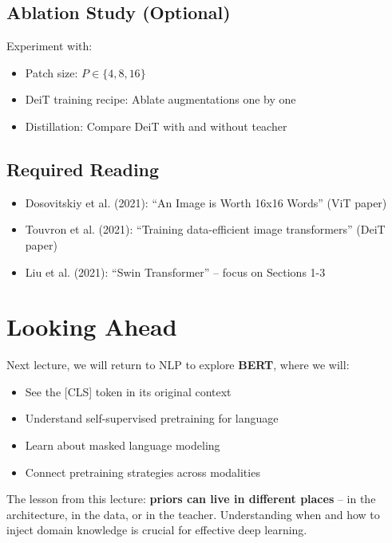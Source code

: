 \documentclass{article}
\begin{document}
\subsection{Ablation Study (Optional)}

Experiment with:
\begin{itemize}
\item Patch size: $P \in \{4, 8, 16\}$
\item DeiT training recipe: Ablate augmentations one by one
\item Distillation: Compare DeiT with and without teacher
\end{itemize}

\subsection{Required Reading}

\begin{itemize}
\item Dosovitskiy et al. (2021): ``An Image is Worth 16x16 Words'' (ViT paper)
\item Touvron et al. (2021): ``Training data-efficient image transformers'' (DeiT paper)
\item Liu et al. (2021): ``Swin Transformer'' -- focus on Sections 1-3
\end{itemize}

\section{Looking Ahead}

Next lecture, we will return to NLP to explore \textbf{BERT}, where we will:
\begin{itemize}
\item See the [CLS] token in its original context
\item Understand self-supervised pretraining for language
\item Learn about masked language modeling
\item Connect pretraining strategies across modalities
\end{itemize}

The lesson from this lecture: \textbf{priors can live in different places} -- in the architecture, in the data, or in the teacher. Understanding when and how to inject domain knowledge is crucial for effective deep learning.
\end{document}
